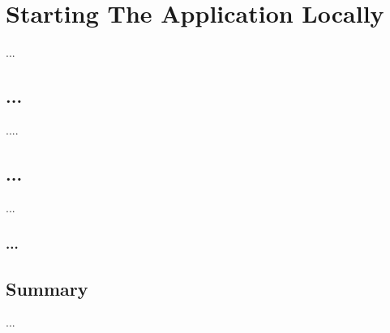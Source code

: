 \chapter{Starting The Application Locally}
\label{start-stop-guide}

...
\section{...}
....


\section{...}
...


\subsection{...}


\section{Summary}
...



